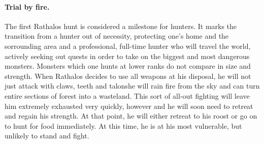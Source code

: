\paragraph*{Trial by fire.} The first Rathalos hunt is considered a milestone for hunters. It marks the transition from a hunter out of necessity, protecting one's home and the sorrounding area and a professional, full-time hunter who will travel the world, actively seeking out quests in order to take on the biggest and most dangerous monsters. Monsters which one hunts at lower ranks do not compare in size and strength. When Rathalos decides to use all weapons at his disposal, he will not just attack with claws, teeth and talons\hbNone he will rain fire from the sky and can turn entire sections of forest into a wasteland. This sort of all-out fighting will leave him extremely exhausted very quickly, however and he will soon need to retreat and regain his strength. At that point, he will either retreat to his roost or go on to hunt for food immediately. At this time, he is at his most vulnerable, but unlikely to stand and fight.

